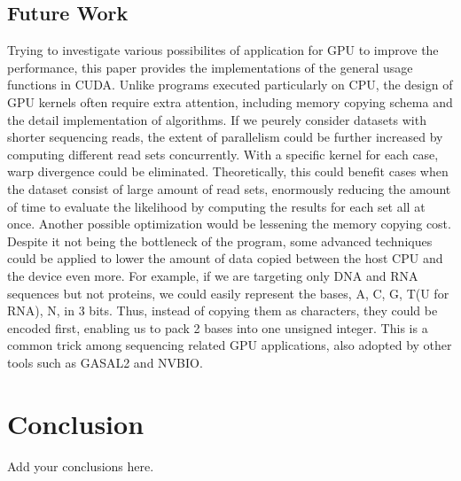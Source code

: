\documentclass{PHlab-thesis}
\begin{document}
\section{Future Work}
Trying to investigate various possibilites of application for GPU to improve the performance, this paper provides the implementations of the general usage functions in CUDA. Unlike programs executed particularly on CPU, the design of GPU kernels often require extra attention, including memory copying schema and the detail implementation of algorithms. If we peurely consider datasets with shorter sequencing reads, the extent of parallelism could be further increased by computing different read sets concurrently. With a specific kernel for each case, warp divergence could be eliminated. Theoretically, this could benefit cases when the dataset consist of large amount of read sets, enormously reducing the amount of time to evaluate the likelihood by computing the results for each set all at once. Another possible optimization would be lessening the memory copying cost. Despite it not being the bottleneck of the program, some advanced techniques could be applied to lower the amount of data copied between the host CPU and the device even more. For example, if we are targeting only DNA and RNA sequences but not proteins, we could easily represent the bases, A, C, G, T(U for RNA), N, in 3 bits. Thus, instead of copying them as characters, they could be encoded first, enabling us to pack 2 bases into one unsigned integer. This is a common trick among sequencing related GPU applications, also adopted by other tools such as GASAL2 and NVBIO.

\chapter{Conclusion}
Add your conclusions here.


\newpage
{}
\printbibliography
\end{document}
